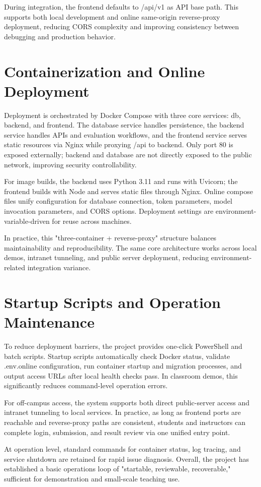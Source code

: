 During integration, the frontend defaults to /api/v1 as API base path. This supports both local development and online same-origin reverse-proxy deployment, reducing CORS complexity and improving consistency between debugging and production behavior.

\section{Containerization and Online Deployment}

Deployment is orchestrated by Docker Compose with three core services: db, backend, and frontend. The database service handles persistence, the backend service handles APIs and evaluation workflows, and the frontend service serves static resources via Nginx while proxying /api to backend. Only port 80 is exposed externally; backend and database are not directly exposed to the public network, improving security controllability.

For image builds, the backend uses Python 3.11 and runs with Uvicorn; the frontend builds with Node and serves static files through Nginx. Online compose files unify configuration for database connection, token parameters, model invocation parameters, and CORS options. Deployment settings are environment-variable-driven for reuse across machines.

In practice, this "three-container + reverse-proxy" structure balances maintainability and reproducibility. The same core architecture works across local demos, intranet tunneling, and public server deployment, reducing environment-related integration variance.

\section{Startup Scripts and Operation Maintenance}

To reduce deployment barriers, the project provides one-click PowerShell and batch scripts. Startup scripts automatically check Docker status, validate .env.online configuration, run container startup and migration processes, and output access URLs after local health checks pass. In classroom demos, this significantly reduces command-level operation errors.

For off-campus access, the system supports both direct public-server access and intranet tunneling to local services. In practice, as long as frontend ports are reachable and reverse-proxy paths are consistent, students and instructors can complete login, submission, and result review via one unified entry point.

At operation level, standard commands for container status, log tracing, and service shutdown are retained for rapid issue diagnosis. Overall, the project has established a basic operations loop of "startable, reviewable, recoverable," sufficient for demonstration and small-scale teaching use.


